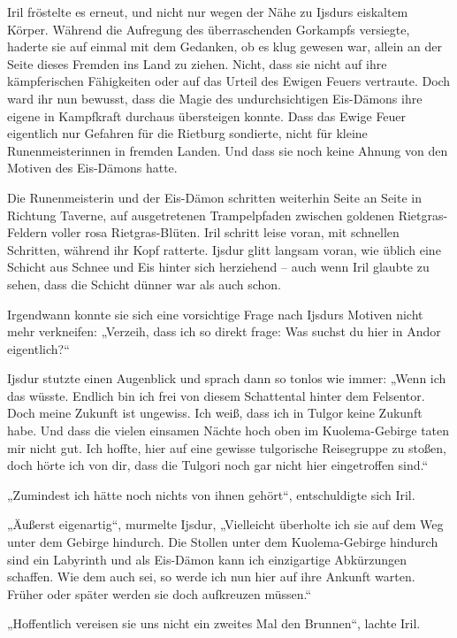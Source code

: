 Iril fröstelte es erneut, und nicht nur wegen der Nähe zu Ijsdurs eiskaltem Körper. Während die Aufregung des überraschenden Gorkampfs versiegte, haderte sie auf einmal mit dem Gedanken, ob es klug gewesen war, allein an der Seite dieses Fremden ins Land zu ziehen. Nicht, dass sie nicht auf ihre kämpferischen Fähigkeiten oder auf das Urteil des Ewigen Feuers vertraute. Doch ward ihr nun bewusst, dass die Magie des undurchsichtigen Eis-Dämons ihre eigene in Kampfkraft durchaus übersteigen konnte. Dass das Ewige Feuer eigentlich nur Gefahren für die Rietburg sondierte, nicht für kleine Runenmeisterinnen in fremden Landen. Und dass sie noch keine Ahnung von den Motiven des Eis-Dämons hatte.\bigskip







Die Runenmeisterin und der Eis-Dämon schritten weiterhin Seite an Seite in Richtung Taverne, auf ausgetretenen Trampelpfaden zwischen goldenen Rietgras-Feldern voller rosa Rietgras-Blüten. Iril schritt leise voran, mit schnellen Schritten, während ihr Kopf ratterte. Ijsdur glitt langsam voran, wie üblich eine Schicht aus Schnee und Eis hinter sich herziehend – auch wenn Iril glaubte zu sehen, dass die Schicht dünner war als auch schon.

Irgendwann konnte sie sich eine vorsichtige Frage nach Ijsdurs Motiven nicht mehr verkneifen: „Verzeih, dass ich so direkt frage: Was suchst du hier in Andor eigentlich?“

Ijsdur stutzte einen Augenblick und sprach dann so tonlos wie immer: „Wenn ich das wüsste. Endlich bin ich frei von diesem Schattental hinter dem Felsentor. Doch meine Zukunft ist ungewiss. Ich weiß, dass ich in Tulgor keine Zukunft habe. Und dass die vielen einsamen Nächte hoch oben im Kuolema-Gebirge taten mir nicht gut. Ich hoffte, hier auf eine gewisse tulgorische Reisegruppe zu stoßen, doch hörte ich von dir, dass die Tulgori noch gar nicht hier eingetroffen sind.“

„Zumindest ich hätte noch nichts von ihnen gehört“, entschuldigte sich Iril.

„Äußerst eigenartig“, murmelte Ijsdur, „Vielleicht überholte ich sie auf dem Weg unter dem Gebirge hindurch. Die Stollen unter dem Kuolema-Gebirge hindurch sind ein Labyrinth und als Eis-Dämon kann ich einzigartige Abkürzungen schaffen. Wie dem auch sei, so werde ich nun hier auf ihre Ankunft warten. Früher oder später werden sie doch aufkreuzen müssen.“

„Hoffentlich vereisen sie uns nicht ein zweites Mal den Brunnen“, lachte Iril.

